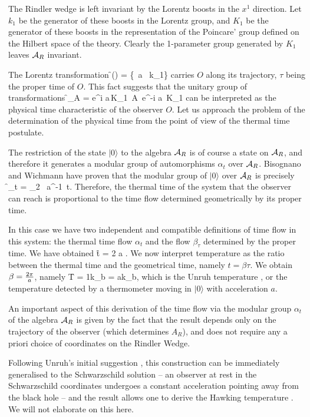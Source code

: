 The Rindler wedge is left invariant by the Lorentz boosts in the
$x^1$ direction.  Let $k_1$ be the generator of these boosts in
the Lorentz group, and $K_1$ be the generator of these boosts in
the representation of the Poincare' group defined on the Hilbert
space of the theory.  Clearly the 1-parameter group generated by
$K_1$ leaves ${\cal A}_R$ invariant.

The Lorentz transformation
\f
	\Lambda(\tau) = \exp\{\tau \, a \, k_1\}
\ff
carries $O$ along its trajectory, $\tau$ being the proper time of
$O$.  This fact suggests that the unitary group of transformations
\f
	\gamma_\tau A
	= e^{i\,\tau\,a\,K_1}\ A\ e^{-i\,\tau\,a \,K_1}
\ff
can be interpreted as the physical time characteristic of the
observer $O$.  Let us approach the problem of the determination
of the physical time from the point of view of the thermal time
postulate.

The restriction of the state $|0\rangle$ to the algebra ${\cal
A}_R$ is of course a state on ${\cal A}_R$, and therefore it
generates a modular group of automorphisms $\alpha_t$ over
${\cal A}_R$.   Bisognano and Wichmann \cite{bisognano} have
proven that the modular group of $|0\rangle$ over ${\cal A}_R$ is
precisely
\f
	\alpha_t = \beta_{2 \pi\, a^{-1}\, t}.
\ff
Therefore, the thermal time of the system that the observer can
reach is proportional to the time flow determined geometrically
by its proper time.

In this case we have two independent and compatible
definitions of time flow in this system: the thermal time flow
$\alpha_t$ and the flow $\beta_\tau$ determined by the proper
time.   We have obtained
\f
	t =  { 2 \pi\over a} \tau.
\ff
We now interpret temperature as the ratio between the thermal
time and the geometrical time, namely $t=\beta\tau$. We obtain
$\beta = { 2 \pi\over a}$,  namely
\f
	T = {1\over k_b\beta} =  {a\pi k_{b}},
\ff
which is the Unruh temperature  \cite{unruh}, or the temperature
detected by a thermometer moving in $|0\rangle$ with
acceleration $a$.

An important aspect of this derivation of the time flow via the
modular group $\alpha_t$ of the algebra ${\cal A}_R$ is given by
the fact that the result depends only on the trajectory of the
observer (which determines $A_R$), and does not require any a
priori choice of coordinates on the Rindler Wedge.

Following Unruh's initial suggestion \cite{unruh}, this
construction can be immediately generalised to the
Schwarzschild solution -- an observer at rest in the
Schwarzschild coordinates undergoes a constant acceleration
pointing away from the black hole -- and the result allows one to
derive the Hawking temperature \cite{hawking}.  We will not
elaborate on this here.

